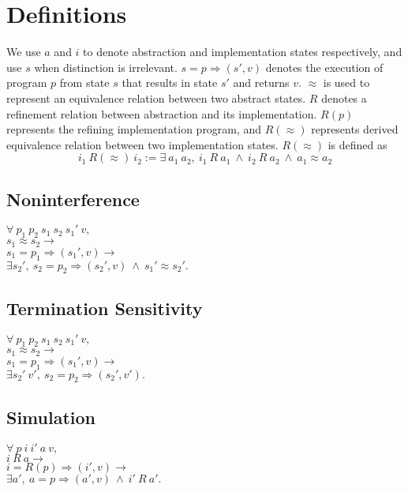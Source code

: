 \section{Definitions}

We use $a$ and $i$ to denote abstraction and implementation states respectively, and use $s$ when distinction is irrelevant.
$s =p\Rightarrow (s', v)$ denotes the execution of program $p$ from state $s$ that results in state $s'$ and returns $v$. $\approx$ is used to represent an equivalence relation between two abstract states. $R$ denotes a refinement relation between abstraction and its implementation. $R(p)$ represents the refining implementation program, and $R(\approx)$ represents derived equivalence relation between two implementation states. $R(\approx)$ is defined as 
$$
i_1\ R(\approx)\ i_2 := \exists\ a_1\ a_2,\ i_1\ R\ a_1\ \wedge\ i_2\ R\ a_2\ \wedge\ a_1 \approx a_2
$$


\subsection{Noninterference}

$\forall\ p_1\ p_2\ s_1\ s_2\ s_1'\ v,$\\
$s_1\approx s_2 \rightarrow$\\
$s_1 =p_1\Rightarrow (s_1', v) \rightarrow$\\
$\exists s_2',\ s_2 =p_2\Rightarrow (s_2', v)\ \wedge\ s_1'\approx s_2'.$\\

\subsection{Termination Sensitivity}

$\forall\ p_1\ p_2\ s_1\ s_2\ s_1'\ v,$\\
$s_1\approx s_2 \rightarrow$\\
$s_1 =p_1\Rightarrow (s_1', v) \rightarrow$\\
$\exists s_2'\ v',\ s_2 =p_2\Rightarrow (s_2', v').$\\

\subsection{Simulation}

$\forall\ p\ i\ i'\ a\ v,$\\
$i\ R\ a \rightarrow$\\
$i =R(p)\Rightarrow (i', v) \rightarrow$\\
$\exists a',\ a =p\Rightarrow (a', v)\ \wedge\ i'\ R\ a'.$\\


